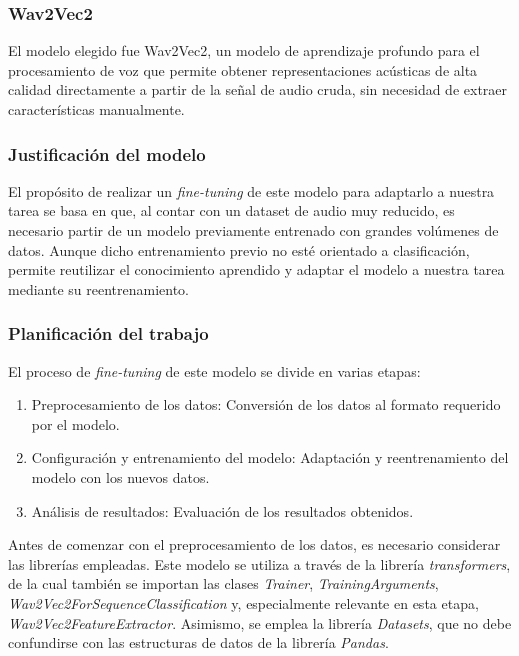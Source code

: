 \subsubsection{Wav2Vec2}

El modelo elegido fue Wav2Vec2, un modelo de aprendizaje profundo para el procesamiento de voz que permite obtener representaciones acústicas de alta calidad directamente a partir de la señal de audio cruda, sin necesidad de extraer características manualmente.

\subsubsection*{Justificación del modelo}

El propósito de realizar un \textit{fine-tuning} de este modelo para adaptarlo a nuestra tarea se basa en que, al contar con un dataset de audio muy reducido, es necesario partir de un modelo previamente entrenado con grandes volúmenes de datos. Aunque dicho entrenamiento previo no esté orientado a clasificación, permite reutilizar el conocimiento aprendido y adaptar el modelo a nuestra tarea mediante su reentrenamiento.

\subsubsection*{Planificación del trabajo}

El proceso de \textit{fine-tuning} de este modelo se divide en varias etapas:

\begin{enumerate}
 \item Preprocesamiento de los datos: Conversión de los datos al formato requerido por el modelo.
 \item Configuración y entrenamiento del modelo: Adaptación y reentrenamiento del modelo con los nuevos datos.
 \item Análisis de resultados: Evaluación de los resultados obtenidos.
\end{enumerate}

Antes de comenzar con el preprocesamiento de los datos, es necesario considerar las librerías empleadas. Este modelo se utiliza a través de la librería \textit{transformers}, de la cual también se importan las clases \textit{Trainer}, \textit{TrainingArguments}, \textit{Wav2Vec2ForSequenceClassification} y, especialmente relevante en esta etapa, \textit{Wav2Vec2FeatureExtractor}. Asimismo, se emplea la librería \textit{Datasets}, que no debe confundirse con las estructuras de datos de la librería \textit{Pandas}.

